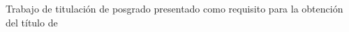 \begin{titlepage}
\thispagestyle{emptyusfq}
\begin{center}
\singlespacing

\vspace*{1.2cm}

{\bfseries\fontsize{14}{17}\selectfont \USFQUniversidad\par}
\vspace{0.4cm}
{\bfseries\fontsize{14}{17}\selectfont \USFQColegio\par}

\vspace{3.0cm}

{\bfseries\fontsize{14}{17}\selectfont \USFQTituloTrabajo\par}

\vspace{2.0cm}

{\bfseries\fontsize{14}{17}\selectfont \USFQMecanismoTitulacion\par}

\vspace{2.0cm}

{\bfseries\fontsize{18}{22}\selectfont \USFQAutor\par}

\vfill

{\bfseries\fontsize{16}{19}\selectfont \USFQDirector\par}
{\bfseries\fontsize{16}{19}\selectfont \USFQDirectorCargo\par}

\vfill

{\fontsize{12}{14}\selectfont Trabajo de titulación de posgrado presentado como requisito para la obtención del título de \USFQTituloObtener\par}

\vspace{1.2cm}

{\fontsize{12}{14}\selectfont \USFQCiudadFecha\par}

\end{center}
\end{titlepage}
